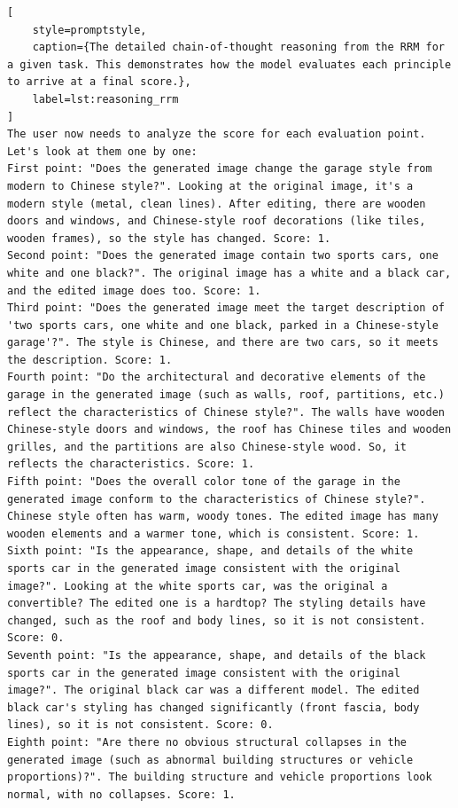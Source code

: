 \begin{lstlisting}[
    style=promptstyle, 
    caption={The detailed chain-of-thought reasoning from the RRM for a given task. This demonstrates how the model evaluates each principle to arrive at a final score.}, 
    label=lst:reasoning_rrm
]
The user now needs to analyze the score for each evaluation point. Let's look at them one by one:
First point: "Does the generated image change the garage style from modern to Chinese style?". Looking at the original image, it's a modern style (metal, clean lines). After editing, there are wooden doors and windows, and Chinese-style roof decorations (like tiles, wooden frames), so the style has changed. Score: 1.
Second point: "Does the generated image contain two sports cars, one white and one black?". The original image has a white and a black car, and the edited image does too. Score: 1.
Third point: "Does the generated image meet the target description of 'two sports cars, one white and one black, parked in a Chinese-style garage'?". The style is Chinese, and there are two cars, so it meets the description. Score: 1.
Fourth point: "Do the architectural and decorative elements of the garage in the generated image (such as walls, roof, partitions, etc.) reflect the characteristics of Chinese style?". The walls have wooden Chinese-style doors and windows, the roof has Chinese tiles and wooden grilles, and the partitions are also Chinese-style wood. So, it reflects the characteristics. Score: 1.
Fifth point: "Does the overall color tone of the garage in the generated image conform to the characteristics of Chinese style?". Chinese style often has warm, woody tones. The edited image has many wooden elements and a warmer tone, which is consistent. Score: 1.
Sixth point: "Is the appearance, shape, and details of the white sports car in the generated image consistent with the original image?". Looking at the white sports car, was the original a convertible? The edited one is a hardtop? The styling details have changed, such as the roof and body lines, so it is not consistent. Score: 0.
Seventh point: "Is the appearance, shape, and details of the black sports car in the generated image consistent with the original image?". The original black car was a different model. The edited black car's styling has changed significantly (front fascia, body lines), so it is not consistent. Score: 0.
Eighth point: "Are there no obvious structural collapses in the generated image (such as abnormal building structures or vehicle proportions)?". The building structure and vehicle proportions look normal, with no collapses. Score: 1.

\end{lstlisting}
